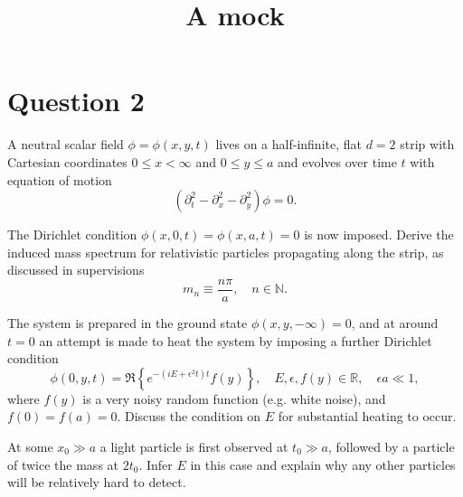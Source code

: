 \documentclass[]{article}
\begin{document}

\title{A mock}





\maketitle




\section*{Question 2}

A neutral scalar field $\phi=\phi(x,y,t)$ lives on a half-infinite, flat $d=2$ strip with Cartesian coordinates ${0\leq x <\infty}$ and ${0\leq y\leq a}$ and evolves over time $t$ with equation of motion
\begin{equation*}
	\left(\partial^2_t-\partial^2_x-\partial^2_y\right)\phi=0.
\end{equation*}

The Dirichlet condition $\phi(x,0,t)=\phi(x,a,t)=0$ is now imposed. Derive the induced mass spectrum for relativistic particles propagating along the strip, as discussed in supervisions
\begin{equation*}
	m_n\equiv \frac{n\pi}{a}, \quad n\in \mathbb{N}.
\end{equation*}

The system is prepared in the ground state $\phi(x,y,-\infty)=0$, and at around $t=0$ an attempt is made to heat the system by imposing a further Dirichlet condition
\begin{equation*}
	\phi(0,y,t)=\mathfrak{R}\left\{e^{-(iE+\epsilon^2 t)t}f(y)\right\},\quad E,\epsilon,f(y) \in\mathbb{R},
	\quad \epsilon a\ll 1,
\end{equation*}
where $f(y)$ is a very noisy random function (e.g. white noise), and $f(0)=f(a)=0$. Discuss the condition on $E$ for substantial heating to occur.

At some $x_0\gg a$ a light particle is first observed at $t_0\gg a$, followed by a particle of twice the mass at $2t_0$. Infer $E$ in this case and explain why any other particles will be relatively hard to detect.


\end{document}
